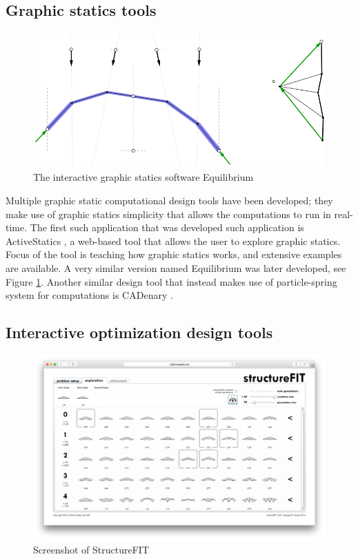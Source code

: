 \subsection{Graphic statics tools}

\begin{figure}
  \includegraphics[width=330pt]{graphics/equilibrium.png}
  \caption{The interactive graphic statics software Equilibrium \cite{Block}}
  \label{fig:equilibrium}
\end{figure}

Multiple graphic static computational design tools have been developed; they make use of graphic statics simplicity that allows the computations to run in real-time. The first such application that was developed such application is ActiveStatics \cite{ActiveStatics}, a web-based tool that allows the user to explore graphic statics. Focus of the tool is teaching how graphic statics works, and extensive examples are available. A very similar version named Equilibrium \cite{Block} was later developed, see Figure \ref{fig:equilibrium}. Another similar design tool that instead makes use of particle-spring system for computations is CADenary \cite{CADenary}.


\subsection{Interactive optimization design tools}

\begin{figure}
  \includegraphics[width=350pt]{graphics/structurefit.png}
  \caption{Screenshot of StructureFIT}
  \label{fig:structurefit}
\end{figure}

